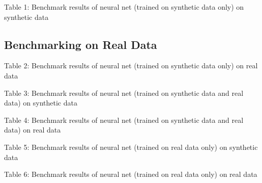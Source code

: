 \documentclass[11pt]{article}
\begin{document}
\begin{center}
	
\begin{center}
Table 1: Benchmark results of neural net (trained on synthetic data only) on synthetic data
\end{center}


\subsection{Benchmarking on Real Data}

\begin{center}

\end{center}
\begin{center}
Table 2: Benchmark results of neural net (trained on synthetic data only) on real data
\end{center}



\begin{center}

\begin{center}
Table 3: Benchmark results of neural net (trained on synthetic data and real data) on synthetic data
\end{center}

\begin{center}

\end{center}
\begin{center}
Table 4: Benchmark results of neural net (trained on synthetic data and real data) on real data
\end{center}

\begin{center}

\end{center}
\begin{center}
Table 5: Benchmark results of neural net (trained on real data only) on synthetic data
\end{center}


\begin{center}

\end{center}
\begin{center}
Table 6: Benchmark results of neural net (trained on real data only) on real data
\end{center}



\end{center}
\end{center}
\end{document}
